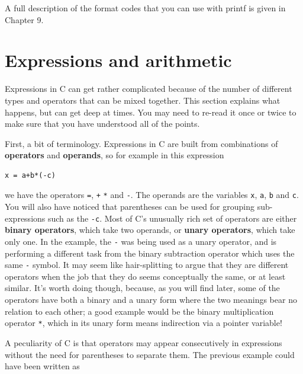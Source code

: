    A full description of the format codes that you can use with printf is
    given in Chapter 9.


  

 
        \section{Expressions and arithmetic}
        

  

  Expressions in C can get rather complicated because of the number of
   different types and operators that can be mixed together. This section
   explains what happens, but can get deep at times. You may need to re-read
   it once or twice to make sure that you have understood all of the
   points.


  First, a bit of terminology. Expressions in C are built from
   combinations of \textbf{operators} and \textbf{operands}, so for
   example in this expression


  \begin{Verbatim}
x = a+b*(-c)
\end{Verbatim}

  we have the operators \texttt{=}, \texttt{+} \texttt{*}
   and \texttt{-}. The operands are the
   variables \texttt{x}, \texttt{a}, \texttt{b}
   and \texttt{c}. You will also have noticed that parentheses can be
   used for grouping sub-expressions such as the \texttt{-c}. Most of
   C's unusually rich set of operators are either \textbf{binary operators},
   which take two operands, or \textbf{unary operators}, which take only
   one. In the example, the \texttt{-} was being used as a unary
   operator, and is performing a different task from the binary subtraction
   operator which uses the same \texttt{-} symbol. It may seem like
   hair-splitting to argue that they are different operators when the job that
   they do seems conceptually the same, or at least similar. It's worth doing
   though, because, as you will find later, some of the operators have both a
   binary and a unary form where the two meanings bear no relation to each
   other; a good example would be the binary multiplication
   operator \texttt{*}, which in its unary form means indirection via
   a pointer variable!


  A peculiarity of C is that operators may appear consecutively in
   expressions without the need for parentheses to separate them. The previous
   example could have been written as


